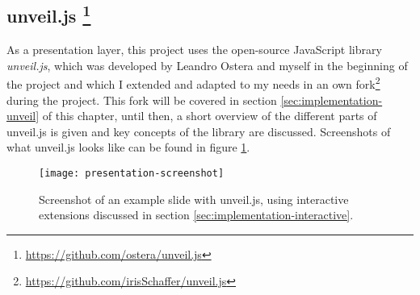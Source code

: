 \subsection[unveil.js]%
             {unveil.js%
             \protect\footnote{\url{https://github.com/ostera/unveil.js}}}    
\label{sec:implementation-technologies-unveil}

As a presentation layer, this project uses the open-source JavaScript library \textit{unveil.js}, which was developed by Leandro Ostera and myself in the beginning of the project and which I extended and adapted to my needs in an own fork\footnote{\url{https://github.com/irisSchaffer/unveil.js}} during the project. This fork will be covered in section \ref{sec:implementation-unveil} of this chapter, until then, a short overview of the different parts of unveil.js is given and key concepts of the library are discussed. Screenshots of what unveil.js looks like can be found in figure \ref{fig:implementation-technologies-unveil-screenshots}.


\begin{figure}
\centering
\texttt{[image: presentation-screenshot]}
\caption{Screenshot of an example slide with unveil.js, using interactive extensions discussed in section \ref{sec:implementation-interactive}.}
\label{fig:implementation-technologies-unveil-screenshots}
\end{figure}


